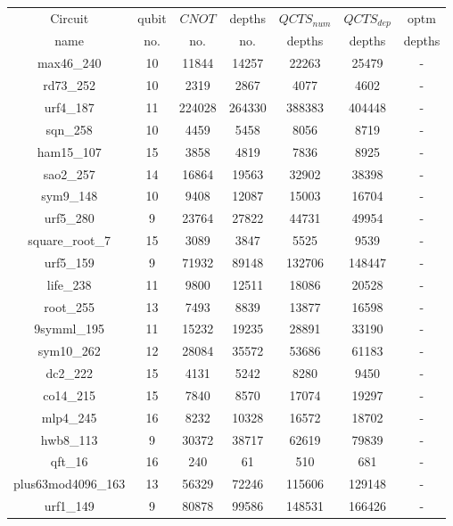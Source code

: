 \documentclass[runningheads]{llncs}
\begin{document}
								\begin{table}[H]
									\begin{center}  
									\begin{tabular}{|c|c|c|c|c|c|c|}
									\hline
									Circuit &  qubit  & $CNOT$ &depths &$QCTS_{num}$& $QCTS_{dep}$  & optm 	  	\\
									 name	&   no. 	&	no. & no. & depths&  depths &  depths 	\\
									\hline
									max46\_240 & 10 & 11844 & 14257 & 22263 & 25479 & - \\
									rd73\_252 & 10 & 2319 & 2867 & 4077 & 4602 & - \\
									urf4\_187 & 11 & 224028 & 264330 & 388383 & 404448 & - \\
									sqn\_258 & 10 & 4459 & 5458 & 8056 & 8719 & - \\
									ham15\_107 & 15 & 3858 & 4819 & 7836 & 8925 & - \\
									sao2\_257 & 14 & 16864 & 19563 & 32902 & 38398 & - \\
									sym9\_148 & 10 & 9408 & 12087 & 15003 & 16704 & - \\
									urf5\_280 & 9 & 23764 & 27822 & 44731 & 49954 & - \\
									square\_root\_7 & 15 & 3089 & 3847 & 5525 & 9539 & - \\
									urf5\_159 & 9 & 71932 & 89148 & 132706 & 148447 & - \\
									life\_238 & 11 & 9800 & 12511 & 18086 & 20528 & - \\
									root\_255 & 13 & 7493 & 8839 & 13877 & 16598 & - \\
									9symml\_195 & 11 & 15232 & 19235 & 28891 & 33190 & - \\
									sym10\_262 & 12 & 28084 & 35572 & 53686 & 61183 & - \\
									dc2\_222 & 15 & 4131 & 5242 & 8280 & 9450 & - \\
									co14\_215 & 15 & 7840 & 8570 & 17074 & 19297 & - \\
									mlp4\_245 & 16 & 8232 & 10328 & 16572 & 18702 & - \\
									hwb8\_113 & 9 & 30372 & 38717 & 62619 & 79839 & - \\
									qft\_16 & 16 & 240 & 61 & 510 & 681 & - \\
									plus63mod4096\_163 & 13 & 56329 & 72246 & 115606 & 129148 & - \\
									urf1\_149 & 9 & 80878 & 99586 & 148531 & 166426 & - \\

\end{tabular}
\end{center}
\end{table}
\end{document}
